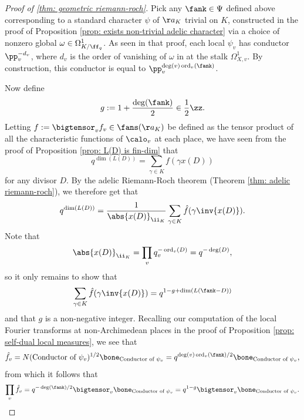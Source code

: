 \documentclass[11pt, x11names, openany]{book}
\begin{document}
\begin{proof}[Proof of \ref{thm: geometric riemann-roch}]
Pick any $\fank \in \Psi$ defined above corresponding to a standard character $\psi$ of $\aa_K$ trivial on $K$, constructed in the proof of Proposition \ref{prop: exists non-trivial adelic character} via a choice of nonzero global $\omega \in \Omega^1_{K/\ff_q}$. As seen in that proof, each local $\psi_v$ has conductor $\pp_v^{-d_v}$, where $d_v$ is the order of vanishing of $\omega$ in at the stalk $\Omega^1_{X, v}$. By construction, this conductor is equal to $\pp_v^{\deg(v) \ord_v(\fank)}$.

Now define
\begin{equation*}
    g := 1 + \frac{\deg(\fank)}{2} \in \frac{1}{2} \zz.
\end{equation*}
Letting $f := \bigtensor_v f_v \in \fans(\aa_K)$ be defined as the tensor product of all the characteristic functions of $\calo_v$ at each place, we have seen from the proof of Proposition \ref{prop: L(D) is fin-dim} that 
\begin{equation*}
    q^{\dim(L(D))} = \sum_{\gamma \in K} f(\gamma x(D))
\end{equation*} 
for any divisor $D$. By the adelic Riemann-Roch theorem (Theorem \ref{thm: adelic riemann-roch}), we therefore get that
\begin{equation*}
    q^{\dim(L(D))} = \frac{1}{\abs{x(D)}_{\ii_K}} \sum_{\gamma \in K} \hat{f}(\gamma \inv{x(D)}).
\end{equation*}
Note that
\begin{equation*}
    \abs{x(D)}_{\ii_K} = \prod_v q_v^{-\ord_v(D)} = q^{- \deg(D)},
\end{equation*}
so it only remains to show that 
\begin{equation*}
    \sum_{\gamma \in K} \hat{f}(\gamma \inv{x(D)}) = q^{1 - g + \dim(L(\fank - D))}
\end{equation*}
and that $g$ is a non-negative integer. Recalling our computation of the local Fourier transforms at non-Archimedean places in the proof of Proposition \ref{prop: self-dual local measures}, we see that
\begin{equation*}
    \hat{f_v} = N(\text{Conductor of } \psi_v)^{1/2} \bone_{\text{Conductor of } \psi_v} = q^{\deg(v)\ord_v(\fank)/2} \bone_{\text{Conductor of } \psi_v},
\end{equation*}
from which it follows that
\begin{equation*}
    \prod_v \hat{f}_v = q^{-\deg(\fank)/2} \bigtensor_v \bone_{\text{Conductor of } \psi_v} = q^{1-g} \bigtensor_v \bone_{\text{Conductor of } \psi_v}.

\end{equation*}
\end{proof}
\end{document}
